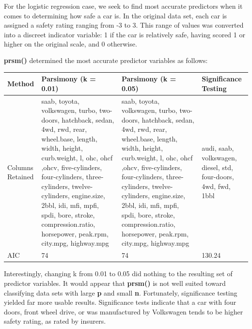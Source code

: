 \documentclass[letter]{article}
\begin{document}
\newpage


For the logistic regression case, we seek to find most accurate predictors when it comes to determining how safe a car is.  In the original data set, each car is assigned a safety rating ranging from -3 to 3.  This range of values was converted into a discreet indicator variable: 1 if the car is relatively safe, having scored 1 or higher on the original scale, and 0 otherwise.

\textbf{prsm()} determined the most accurate predictor variables as follows:\\
\begin{center}
    \begin{tabular}{ | l |  p{4cm} |  p{4cm} | p{4cm} |}
    \hline
    Method & Parsimony (k = 0.01) & Parsimony (k = 0.05) & Significance Testing \\ \hline
    	
    Columns Retained & saab, toyota, volkswagen, turbo, two-doors, hatchback, sedan, 4wd, rwd, rear, wheel.base, length, width, height, curb.weight, l, ohc, ohcf ,ohcv, five-cylinders, four-cylinders, three-cylinders, twelve-cylinders, engine.size, 2bbl, idi, mfi, mpfi, spdi, bore, stroke, compression.ratio, horsepower, peak.rpm, city.mpg, highway.mpg & saab, toyota, volkswagen, turbo, two-doors, hatchback, sedan, 4wd, rwd, rear, wheel.base, length, width, height, curb.weight, l, ohc, ohcf ,ohcv, five-cylinders, four-cylinders, three-cylinders, twelve-cylinders, engine.size, 2bbl, idi, mfi, mpfi, spdi, bore, stroke, compression.ratio, horsepower, peak.rpm, city.mpg, highway.mpg & audi, saab, volkswagen, diesel, std, four-doors, 4wd, fwd, 1bbl\\ \hline
    
    AIC & 74 & 74 & 130.24\\ \hline
    
    \end{tabular}
\end{center}

Interestingly, changing k from 0.01 to 0.05 did nothing to the resulting set of predictor variables.  It would appear that \textbf{prsm()} is not well suited toward classifying data sets with large \textbf{p} and small \textbf{n}.  Fortunately, significance testing yielded far more usable results.  Significance tests indicate that a car with four doors, front wheel drive, or was manufactured by Volkswagen tends to be higher safety rating, as rated by insurers.
\end{document}
